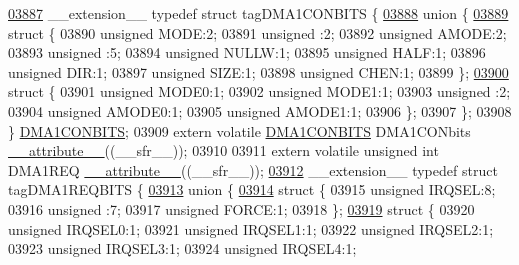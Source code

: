 \begin{DoxyCode}
\hypertarget{a00015_source_l03887}{}\hyperlink{a00014}{03887} \_\_extension\_\_ \textcolor{keyword}{typedef} \textcolor{keyword}{struct }tagDMA1CONBITS \{
\hypertarget{a00015_source_l03888}{}\hyperlink{a00015}{03888}   \textcolor{keyword}{union }\{
\hypertarget{a00015_source_l03889}{}\hyperlink{a00015}{03889}     \textcolor{keyword}{struct }\{
03890       \textcolor{keywordtype}{unsigned} MODE:2;
03891       \textcolor{keywordtype}{unsigned} :2;
03892       \textcolor{keywordtype}{unsigned} AMODE:2;
03893       \textcolor{keywordtype}{unsigned} :5;
03894       \textcolor{keywordtype}{unsigned} NULLW:1;
03895       \textcolor{keywordtype}{unsigned} HALF:1;
03896       \textcolor{keywordtype}{unsigned} DIR:1;
03897       \textcolor{keywordtype}{unsigned} SIZE:1;
03898       \textcolor{keywordtype}{unsigned} CHEN:1;
03899     \};
\hypertarget{a00015_source_l03900}{}\hyperlink{a00015}{03900}     \textcolor{keyword}{struct }\{
03901       \textcolor{keywordtype}{unsigned} MODE0:1;
03902       \textcolor{keywordtype}{unsigned} MODE1:1;
03903       \textcolor{keywordtype}{unsigned} :2;
03904       \textcolor{keywordtype}{unsigned} AMODE0:1;
03905       \textcolor{keywordtype}{unsigned} AMODE1:1;
03906     \};
03907   \};
03908 \} \hyperlink{a00014_d1/d8b/a00406}{DMA1CONBITS};
03909 \textcolor{keyword}{extern} \textcolor{keyword}{volatile} \hyperlink{a00014_d1/d8b/a00406}{DMA1CONBITS} DMA1CONbits \hyperlink{a00015_a493c46f03454991ccc5aa7a6e1dfb2a7}{\_\_attribute\_\_}((\_\_sfr\_\_));
03910 
03911 \textcolor{keyword}{extern} \textcolor{keyword}{volatile} \textcolor{keywordtype}{unsigned} \textcolor{keywordtype}{int}  DMA1REQ \hyperlink{a00015_a493c46f03454991ccc5aa7a6e1dfb2a7}{\_\_attribute\_\_}((\_\_sfr\_\_));
\hypertarget{a00015_source_l03912}{}\hyperlink{a00014}{03912} \_\_extension\_\_ \textcolor{keyword}{typedef} \textcolor{keyword}{struct }tagDMA1REQBITS \{
\hypertarget{a00015_source_l03913}{}\hyperlink{a00015}{03913}   \textcolor{keyword}{union }\{
\hypertarget{a00015_source_l03914}{}\hyperlink{a00015}{03914}     \textcolor{keyword}{struct }\{
03915       \textcolor{keywordtype}{unsigned} IRQSEL:8;
03916       \textcolor{keywordtype}{unsigned} :7;
03917       \textcolor{keywordtype}{unsigned} FORCE:1;
03918     \};
\hypertarget{a00015_source_l03919}{}\hyperlink{a00015}{03919}     \textcolor{keyword}{struct }\{
03920       \textcolor{keywordtype}{unsigned} IRQSEL0:1;
03921       \textcolor{keywordtype}{unsigned} IRQSEL1:1;
03922       \textcolor{keywordtype}{unsigned} IRQSEL2:1;
03923       \textcolor{keywordtype}{unsigned} IRQSEL3:1;
03924       \textcolor{keywordtype}{unsigned} IRQSEL4:1;

\end{DoxyCode}
